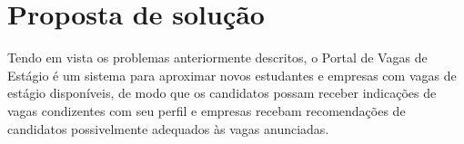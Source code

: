 \section{Proposta de solução}
Tendo em vista os problemas anteriormente descritos, o Portal de Vagas de Estágio é um sistema para aproximar novos estudantes e empresas com vagas de estágio disponíveis, de modo que os candidatos possam receber indicações de vagas condizentes com seu perfil e empresas recebam recomendações de candidatos possivelmente adequados às vagas anunciadas.